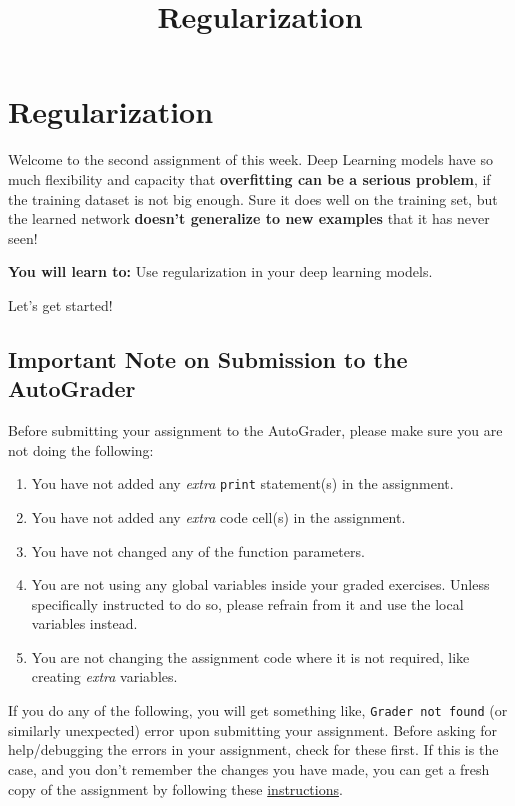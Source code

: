 \documentclass[11pt]{article}
\title{Regularization}
\providecommand{\tightlist}{%
      \setlength{\itemsep}{0pt}\setlength{\parskip}{0pt}}
\begin{document}
    
    \maketitle
    
    

    
    \hypertarget{regularization}{%
\section{Regularization}\label{regularization}}

Welcome to the second assignment of this week. Deep Learning models have
so much flexibility and capacity that \textbf{overfitting can be a
serious problem}, if the training dataset is not big enough. Sure it
does well on the training set, but the learned network \textbf{doesn't
generalize to new examples} that it has never seen!

\textbf{You will learn to:} Use regularization in your deep learning
models.

Let's get started!

\hypertarget{important-note-on-submission-to-the-autograder}{%
\subsection{Important Note on Submission to the
AutoGrader}\label{important-note-on-submission-to-the-autograder}}

Before submitting your assignment to the AutoGrader, please make sure
you are not doing the following:

\begin{enumerate}
\def\labelenumi{\arabic{enumi}.}
\tightlist
\item
  You have not added any \emph{extra} \texttt{print} statement(s) in the
  assignment.
\item
  You have not added any \emph{extra} code cell(s) in the assignment.
\item
  You have not changed any of the function parameters.
\item
  You are not using any global variables inside your graded exercises.
  Unless specifically instructed to do so, please refrain from it and
  use the local variables instead.
\item
  You are not changing the assignment code where it is not required,
  like creating \emph{extra} variables.
\end{enumerate}

If you do any of the following, you will get something like,
\texttt{Grader\ not\ found} (or similarly unexpected) error upon
submitting your assignment. Before asking for help/debugging the errors
in your assignment, check for these first. If this is the case, and you
don't remember the changes you have made, you can get a fresh copy of
the assignment by following these
\href{https://www.coursera.org/learn/deep-neural-network/supplement/QWEnZ/h-ow-to-refresh-your-workspace}{instructions}.
\end{document}
